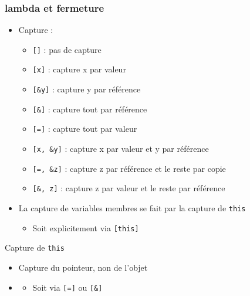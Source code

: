 \documentclass[C++.tex]{subfiles}
\begin{document}
\begin{frame}[fragile]
	\frametitle{lambda et fermeture}
	\begin{itemize}
		\item Capture :
		\begin{itemize}
			\item{} \lstinline|[]| : pas de capture
			\item{} \lstinline|[x]| : capture x par valeur
			\item{} \lstinline|[&y]| : capture y par référence
			\item{} \lstinline|[&]| : capture tout par référence
			\item{} \lstinline|[=]|  : capture tout par valeur
			\item{} \lstinline|[x, &y]| : capture x par valeur et y par référence
			\item{} \lstinline|[=, &z]| : capture z par référence et le reste par copie
			\item{} \lstinline|[&, z]| : capture z par valeur et le reste par référence
		\end{itemize}

		\item La capture de variables membres se fait par la capture de  \lstinline|this|
		\begin{itemize}
			\item Soit explicitement via \lstinline|[this]|
		\end{itemize}
	\end{itemize}

	\begin{alertblock}{Capture de \lstinline|this|}
		\begin{itemize}
			\item Capture du pointeur, non de l'objet
		\end{itemize}
	
	\end{alertblock}
			
	\begin{itemize}
		\item [] \begin{itemize}
			\item Soit via \lstinline|[=]| ou \lstinline|[&]|

		\end{itemize}
	\end{itemize}
\end{frame}
\end{document}
